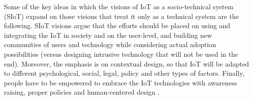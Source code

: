 Some of the key ideas in which the visions of IoT as a socio-technical system (SIoT) expand on those visions that treat it only as a technical system are the following. SIoT visions argue that the efforts should be placed on using and integrating the IoT in society and on the user-level, and building new communities of users and technology while considering actual adoption possibilities (versus designing intrusive technology that will not be used in the end). Moreover, the emphasis is on contextual design, so that IoT will be adapted to different psychological, social, legal, policy and other types of factors. Finally, people have to be empowered to embrace the IoT technologies with awareness raising, proper policies and  human-centered design \cite{ning2011future,Shin2014}.


